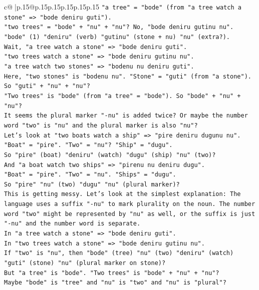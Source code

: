 \documentclass{article}
\begin{document}
{\begin{supertabular}{c@{$\;$}|p{.15\linewidth}@{}p{.15\linewidth}p{.15\linewidth}p{.15\linewidth}p{.15\linewidth}p{.15\linewidth}}
{{{\texttt{"a tree" = "bode" (from "a tree watch a stone" => "bode deniru guti").} \\
\texttt{"two trees" = "bode" + "nu" + "nu"? No, "bode deniru gutinu nu". "bode" (1) "deniru" (verb) "gutinu" (stone + nu) "nu" (extra?).} \\
\texttt{Wait, "a tree watch a stone" => "bode deniru guti".} \\
\texttt{"two trees watch a stone" => "bode deniru gutinu nu".} \\
\texttt{"a tree watch two stones" => "bodenu nu deniru guti".} \\
\texttt{Here, "two stones" is "bodenu nu". "Stone" = "guti" (from "a stone"). So "guti" + "nu" + "nu"?} \\
\texttt{"Two trees" is "bode" (from "a tree" = "bode"). So "bode" + "nu" + "nu"?} \\
\texttt{It seems the plural marker "{-}nu" is added twice? Or maybe the number word "two" is "nu" and the plural marker is also "nu"?} \\
\texttt{Let's look at "two boats watch a ship" => "pire deniru dugunu nu".} \\
\texttt{"Boat" = "pire". "Two" = "nu"? "Ship" = "dugu".} \\
\texttt{So "pire" (boat) "deniru" (watch) "dugu" (ship) "nu" (two)?} \\
\texttt{And "a boat watch two ships" => "pirenu nu deniru dugu".} \\
\texttt{"Boat" = "pire". "Two" = "nu". "Ships" = "dugu".} \\
\texttt{So "pire" "nu" (two) "dugu" "nu" (plural marker)?} \\
\texttt{This is getting messy. Let's look at the simplest explanation: The language uses a suffix "{-}nu" to mark plurality on the noun. The number word "two" might be represented by "nu" as well, or the suffix is just "{-}nu" and the number word is separate.} \\
\texttt{In "a tree watch a stone" => "bode deniru guti".} \\
\texttt{In "two trees watch a stone" => "bode deniru gutinu nu".} \\
\texttt{If "two" is "nu", then "bode" (tree) "nu" (two) "deniru" (watch) "guti" (stone) "nu" (plural marker on stone)?} \\
\texttt{But "a tree" is "bode". "Two trees" is "bode" + "nu" + "nu"?} \\
\texttt{Maybe "bode" is "tree" and "nu" is "two" and "nu" is "plural"?} \\
}}}
\end{supertabular}}
\end{document}
